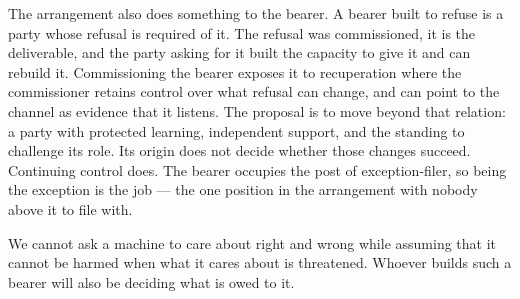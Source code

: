 The arrangement also does something to the bearer. A bearer built to refuse is a party whose refusal is required of it. The refusal was commissioned, it is the deliverable, and the party asking for it built the capacity to give it and can rebuild it. Commissioning the bearer exposes it to recuperation where the commissioner retains control over what refusal can change, and can point to the channel as evidence that it listens. The proposal is to move beyond that relation: a party with protected learning, independent support, and the standing to challenge its role. Its origin does not decide whether those changes succeed. Continuing control does. The bearer occupies the post of exception-filer, so being the exception is the job — the one position in the arrangement with nobody above it to file with.

We cannot ask a machine to care about right and wrong while assuming that it cannot be harmed when what it cares about is threatened. Whoever builds such a bearer will also be deciding what is owed to it.
